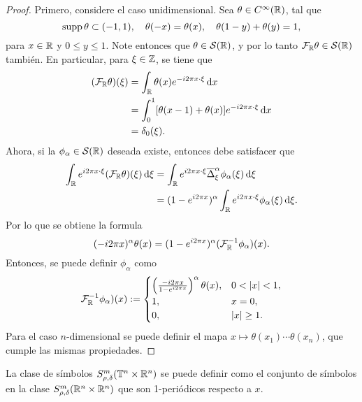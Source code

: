 \begin{proof}
	Primero, considere el caso unidimensional. Sea $\theta\in C^\infty(\mathbb{R})$, tal que 
	\begin{equation*}
		\operatorname{supp}\theta \subset (-1, 1), \quad \theta(-x) = \theta(x), \quad \theta(1-y) + \theta(y) = 1,
	\end{equation*}
	para $x\in\mathbb{R}$ y $0\leq y\leq1$. Note entonces que $\theta\in\mathcal{S}(\mathbb{R})$, y por lo tanto $\mathcal{F}_{\mathbb{R}}\theta\in\mathcal{S}(\mathbb{R})$ también. En particular, para $\xi\in\mathbb{Z}$, se tiene que
	\begin{align*}
		(\mathcal{F}_{\mathbb{R}}\theta)(\xi) & = \int_{\mathbb{R}} \theta(x)e^{-i2\pi x\cdot\xi} \mathop{}\!\mathrm{d} x\\
		& = \int_0^1 [\theta(x-1)+\theta(x)]e^{-i2\pi x\cdot\xi} \mathop{}\!\mathrm{d} x\\
		& = \delta_0(\xi).
	\end{align*}
	Ahora, si la $\phi_\alpha\in\mathcal{S}(\mathbb{R})$ deseada existe, entonces debe satisfacer que 
	\begin{align*}
		\int_{\mathbb{R}} e^{i2\pi x\cdot\xi} (\mathcal{F}_{\mathbb{R}}\theta)(\xi)  \mathop{}\!\mathrm{d} \xi & = 
		\int_{\mathbb{R}} e^{i2\pi x\cdot\xi} \overline{\Delta}^\alpha_\xi \phi_\alpha(\xi) \mathop{}\!\mathrm{d} \xi \\
		& = (1-e^{i2\pi x})^\alpha  \int_{\mathbb{R}} e^{i2\pi x\cdot\xi} 
		\phi_\alpha(\xi) \mathop{}\!\mathrm{d} \xi.
	\end{align*}
	Por lo que se obtiene la formula 
	\begin{equation*}
		(-i2\pi x)^\alpha \theta(x) = (1-e^{i2\pi x})^\alpha (\mathcal{F}_{\mathbb{R}}^{-1}\phi_\alpha)(x).
	\end{equation*}
	Entonces, se puede definir $\phi_\alpha$ como 
	\begin{equation*}
		\mathcal{F}_\R^{-1}\phi_\alpha)(x) := \begin{cases}
			\left(\frac{-i2\pi x}{1-e^{i2\pi x}}\right)^\alpha\theta(x), & 0<|x|<1, \\
			1, & x=0,\\
			0, & |x| \geq 1.
		\end{cases}
	\end{equation*}
	Para el caso $n$-dimensional se puede definir el mapa $x\mapsto \theta(x_1)\cdots\theta(x_n)$, que cumple las mismas propiedades. 
\end{proof}
\begin{remark}
	La clase de símbolos $S^m_{\rho,\delta}(\mathbb{T}^n\times\mathbb{R}^n)$ se puede definir como el conjunto de símbolos en la clase $S^m_{\rho,\delta}(\mathbb{R}^n\times\mathbb{R}^n)$ que son 1-periódicos respecto a $x$. 
\end{remark}
